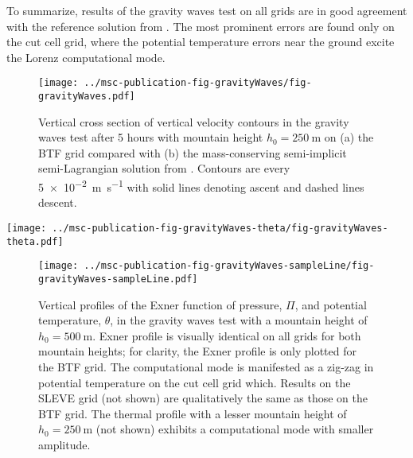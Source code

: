 \documentclass[twocol]{ametsoc}
\begin{document}
To summarize, results of the gravity waves test on all grids are in good agreement with the reference solution from \citet{melvin2010}.  The most prominent errors are found only on the cut cell grid, where the potential temperature errors near the ground excite the Lorenz computational mode.

\begin{figure}
	\centering
	\texttt{[image: ../msc-publication-fig-gravityWaves/fig-gravityWaves.pdf]}
%
	\caption{Vertical cross section of vertical velocity contours in the gravity waves test after 5 hours with mountain height $h_0 = \SI{250}{\meter}$ on (a) the BTF grid compared with (b) the mass-conserving semi-implicit semi-Lagrangian solution from \citet{melvin2010}.  Contours are every \SI{5e-2}{\meter\per\second} with solid lines denoting ascent and dashed lines descent.}
	\label{fig:gw-w}
\end{figure}

\begin{figure*}
	\centering
	\texttt{[image: ../msc-publication-fig-gravityWaves-theta/fig-gravityWaves-theta.pdf]}
%
	\caption{Anomalies in potential temperature in the gravity waves test after 5 hours with a mountain height, \(h_0 = \SI{250}{\meter}\).  The central domain in the lowest \SI{12}{\kilo\meter} is shown on (a) the BTF grid, and (c) the cut cell grid.  The four lowest layers of each grid are shown for (b) BTF, and (d) cut cell grids, using a narrower potential temperature scale.  The results on the SLEVE grid (not shown) are qualitatively identical to results on the BTF grid.}
	\label{fig:gw-theta}
\end{figure*}

\begin{figure}
	\centering
	\texttt{[image: ../msc-publication-fig-gravityWaves-sampleLine/fig-gravityWaves-sampleLine.pdf]}
%
	\caption{Vertical profiles of the Exner function of pressure, \(\Pi\), and potential temperature, \(\theta\), in the gravity waves test with a mountain height of \(h_0 = \SI{500}{\meter}\).  Exner profile is visually identical on all grids for both mountain heights; for clarity, the Exner profile is only plotted for the BTF grid.  The computational mode is manifested as a zig-zag in potential temperature on the cut cell grid which.   Results on the SLEVE grid (not shown) are qualitatively the same as those on the BTF grid.  The thermal profile with a lesser mountain height of \(h_0 = \SI{250}{\meter}\) (not shown) exhibits a computational mode with smaller amplitude.}
	\label{fig:gw-exner-theta}
\end{figure}
\end{document}
